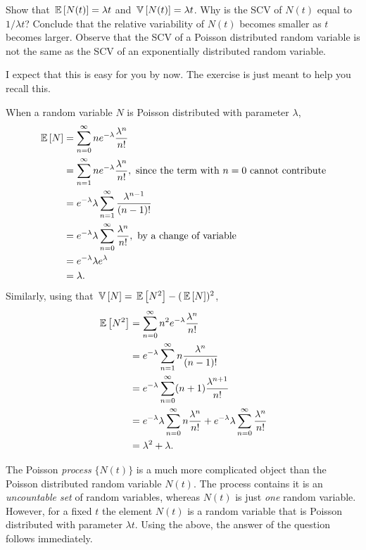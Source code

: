 \begin{question}
  Show that $\,\mathbb{E}\left[N(t)\right] = \lambda t$ and $\,\mathbb{V}\left[N(t)\right] = \lambda t$. Why is
  the SCV of $N(t)$ equal to $1/\lambda t$? Conclude that the relative
  variability of $N(t)$ becomes smaller as $t$ becomes larger. Observe
  that the SCV of a Poisson distributed random variable is not the
  same as the SCV of an exponentially distributed random variable.


  \begin{solution} I expect that this is easy for you by now. The
    exercise is just meant to help you recall this.

    When a random variable $N$ is Poisson distributed with parameter
    $\lambda$,
    \begin{equation*}
      \begin{split}
      \,\mathbb{E}\left[N\right] 
&= \sum_{n=0}^\infty n e^{-\lambda}\frac{\lambda^n}{n!}  \\
&= \sum_{n=1}^\infty n e^{-\lambda}\frac{\lambda^n}{n!}, \text{ since the term with $n=0$ cannot contribute} \\
&= e^{-\lambda} \lambda \sum_{n=1}^\infty \frac{\lambda^{n-1}}{(n-1)!} \\
&= e^{-\lambda} \lambda \sum_{n=0}^\infty \frac{\lambda^{n}}{n!}, \text{ by a change of variable}\\
&= e^{-\lambda} \lambda e^{\lambda} \\
&= \lambda.
      \end{split}
    \end{equation*}
Similarly, using that $\,\mathbb{V}\left[N\right] = \,\mathbb{E}\left[N^2\right] - (\,\mathbb{E}\left[N\right])^2$, 
    \begin{equation*}
      \begin{split}
      \,\mathbb{E}\left[N^2\right]
&= \sum_{n=0}^\infty n^2 e^{-\lambda}\frac{\lambda^n}{n!}  \\
&= e^{-\lambda} \sum_{n=1}^\infty n \frac{\lambda^n}{(n-1)!}  \\
&= e^{-\lambda} \sum_{n=0}^\infty (n+1) \frac{\lambda^{n+1}}{n!}  \\
&= e^{-\lambda} \lambda \sum_{n=0}^\infty n \frac{\lambda^{n}}{n!}  +e^{-\lambda}\lambda \sum_{n=0}^\infty\frac{\lambda^{n}}{n!}  \\
&= \lambda^2  + \lambda.
\end{split}
\end{equation*}

The Poisson \emph{process} $\{N(t)\}$ is a much more complicated
object than the Poisson distributed random variable $N(t)$. The
process contains it is an \emph{ uncountable set} of random variables,
whereas $N(t)$ is just \emph{one} random variable. However, for a
fixed $t$ the element $N(t)$ is a random variable that is Poisson
distributed with parameter $\lambda t$. Using the above, the answer of
the question follows immediately.



\end{solution}
\end{question}
